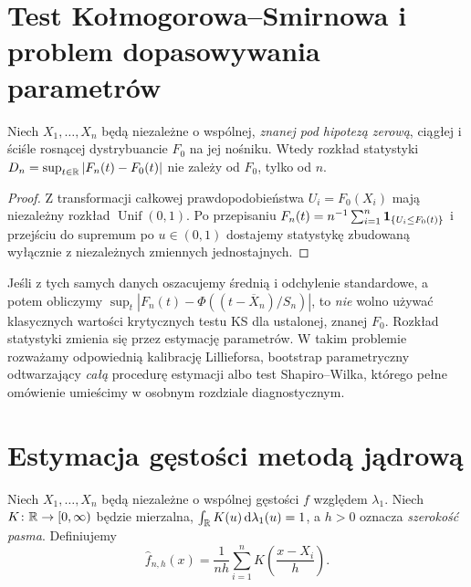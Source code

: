 \section{Test Kołmogorowa--Smirnowa i problem dopasowywania parametrów}
\begin{stwierdzenie}
\label{prop:ks-distributionfree}
Niech $X_1,\ldots,X_n$ będą niezależne o wspólnej,
\emph{znanej pod hipotezą zerową}, ciągłej i ściśle
rosnącej dystrybuancie $F_0$ na jej nośniku.
Wtedy rozkład statystyki
$D_n=\sup_{t\in\mathbb R}|F_n(t)-F_0(t)|$
nie zależy od $F_0$, tylko od $n$.
\end{stwierdzenie}
\begin{proof}
Z transformacji całkowej prawdopodobieństwa
$U_i=F_0(X_i)$ mają niezależny rozkład
$\operatorname{Unif}(0,1)$. Po przepisaniu
$F_n(t)=n^{-1}\sum_{i=1}^n\mathbf 1_{\{U_i\le F_0(t)\}}$
i przejściu do supremum po $u\in(0,1)$
dostajemy statystykę zbudowaną wyłącznie z
niezależnych zmiennych jednostajnych.
\end{proof}

\begin{uwaga}
Jeśli z tych samych danych oszacujemy średnią i
odchylenie standardowe, a potem obliczymy
$\sup_t|F_n(t)-\Phi((t-\overline X_n)/S_n)|$,
to \emph{nie} wolno używać klasycznych wartości
krytycznych testu KS dla ustalonej, znanej $F_0$.
Rozkład statystyki zmienia się przez estymację parametrów.
W takim problemie rozważamy odpowiednią kalibrację
Lillieforsa, bootstrap parametryczny odtwarzający
\emph{całą} procedurę estymacji albo test Shapiro--Wilka,
którego pełne omówienie umieścimy w osobnym
rozdziale diagnostycznym.
\end{uwaga}

\section{Estymacja gęstości metodą jądrową}
\begin{definicja}
\label{def:kde}
Niech $X_1,\ldots,X_n$ będą niezależne o wspólnej
gęstości $f$ względem $\lambda_1$. Niech
$K\colon\mathbb R\to[0,\infty)$ będzie mierzalna,
$\int_\mathbb R K(u)\,\mathrm d\lambda_1(u)=1$,
a $h>0$ oznacza \emph{szerokość pasma}.
Definiujemy
\[
 \widehat f_{n,h}(x)=\frac1{nh}
 \sum_{i=1}^nK\left(\frac{x-X_i}{h}\right).
\]
\end{definicja}

